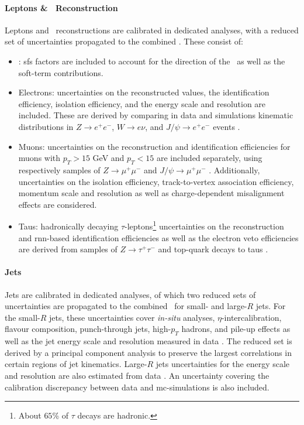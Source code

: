 \paragraph{Leptons \& \etm\ Reconstruction} Leptons and \etm\ reconstructions are calibrated in dedicated analyses, with a reduced set of uncertainties propagated to the combined \vhbc. These consist of:
\begin{itemize}
    \item \etm: \gls{sf}s factors are included to account for the direction of the \etm\ as well as the soft-term contributions. %
    \item Electrons: uncertainties on the reconstructed values, the identification efficiency, isolation efficiency, and the energy scale and resolution are included. These are derived by comparing in data and simulations kinematic distributions in $Z \rightarrow e^+ e^-$, $W\rightarrow e\nu$, and $J/\psi \rightarrow e^+e^-$ events \Cite{Aaboud:2657964}. 
    \item Muons: uncertainties on the reconstruction and identification efficiencies for muons with $p_T > 15$ GeV and $p_T < 15$ are included separately, using respectively samples of $Z\rightarrow \mu^+\mu^-$ and $J/\psi \rightarrow \mu^+\mu^-$ \cite{Aad:2746302}. Additionally, uncertainties on the isolation efficiency, track-to-vertex association efficiency, momentum scale and resolution as well as charge-dependent misalignment effects are considered. 
    \item Taus: hadronically decaying $\tau$-leptons\footnote{About $65$\% of $\tau$ decays are hadronic.} uncertainties on the reconstruction and \gls{rnn}-based identification efficiencies as well as the electron veto efficiencies are derived from samples of $Z\rightarrow\tau^+ \tau^-$ and top-quark decays to taus \cite{ATL-PHYS-PUB-2019-033, ATL-PHYS-PUB-2015-045, ATLAS-CONF-2017-029}.
\end{itemize}

\paragraph{Jets} Jets are calibrated in dedicated analyses, of which two reduced sets of uncertainties are propagated to the combined \vhbc\ for small- and large-$R$ jets. For the small-$R$ jets, these uncertainties cover \textit{in-situ} analyses, $\eta$-intercalibration, flavour composition, punch-through jets, high-$p_T$ hadrons, and pile-up effects as well as the jet energy scale and resolution measured in data \cite{ATLASjesjerMeas, Aad:2854733}. The reduced set is derived by a principal component analysis to preserve the largest correlations in certain regions of jet kinematics. Large-$R$ jets uncertainties for the energy scale and resolution are also estimated from data \cite{ATLAS:2018bip}. An uncertainty covering the calibration discrepancy between data and \gls{mc}-simulations is also included.

